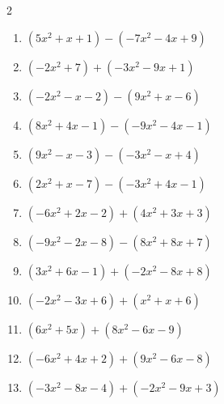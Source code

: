 \begin{multicols}{2}
\begin{enumerate}

  \item $(5x^{2}+x+1)-(-7x^{2}-4x+9)$


\columnbreak %

  \item $(-2x^{2}+7)+(-3x^{2}-9x+1)$


  \item $(-2x^{2}-x-2)-(9x^{2}+x-6)$


  \item $(8x^{2}+4x-1)-(-9x^{2}-4x-1)$


  \item $(9x^{2}-x-3)-(-3x^{2}-x+4)$


  \item $(2x^{2}+x-7)-(-3x^{2}+4x-1)$


  \item $(-6x^{2}+2x-2)+(4x^{2}+3x+3)$


  \item $(-9x^{2}-2x-8)-(8x^{2}+8x+7)$


  \item $(3x^{2}+6x-1)+(-2x^{2}-8x+8)$


  \item $(-2x^{2}-3x+6)+(x^{2}+x+6)$


  \item $(6x^{2}+5x)+(8x^{2}-6x-9)$


  \item $(-6x^{2}+4x+2)+(9x^{2}-6x-8)$


  \item $(-3x^{2}-8x-4)+(-2x^{2}-9x+3)$



\end{enumerate}
\end{multicols}
